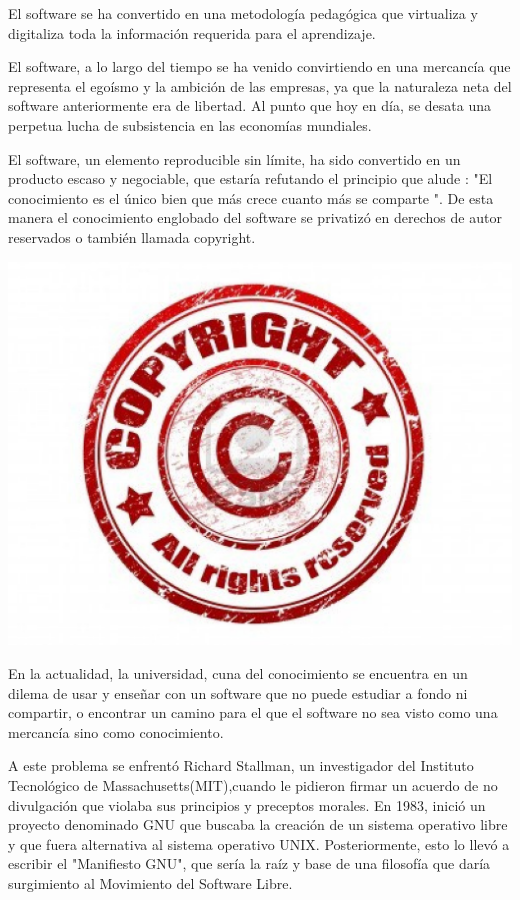 El software se ha convertido en una metodología pedagógica
que virtualiza y digitaliza toda la información requerida para el
aprendizaje.

El software, a lo largo del tiempo se ha venido convirtiendo en
una mercancía que representa el egoísmo y la ambición de las
empresas, ya que la naturaleza neta del software anteriormente
era de libertad. Al punto que hoy en día, se desata una perpetua
lucha de subsistencia en las economías mundiales.

El software, un elemento reproducible sin límite, ha sido
convertido en un producto escaso y negociable, que estaría
refutando el principio que alude : "El conocimiento es el único
bien que más crece cuanto más se comparte ". De esta manera
el conocimiento englobado del software se privatizó en derechos
de autor reservados o también llamada copyright.

\includegraphics[scale=0.25]{img/cp06/img0603.png}

En la actualidad, la universidad, cuna del conocimiento se
encuentra en un dilema de usar y enseñar con un software que
no puede estudiar a fondo ni compartir, o encontrar un camino
para el que el software no sea visto como una mercancía sino
como conocimiento.

A este problema se enfrentó Richard Stallman, un investigador
del Instituto Tecnológico de Massachusetts(MIT),cuando le
pidieron firmar un acuerdo de no divulgación que violaba sus
principios y preceptos morales. En 1983, inició un proyecto
denominado GNU que buscaba la creación de un sistema
operativo libre y que fuera alternativa al sistema operativo
UNIX. Posteriormente, esto lo llevó a escribir el "Manifiesto
GNU", que sería la raíz y base de una filosofía que daría
surgimiento al Movimiento del Software Libre.

